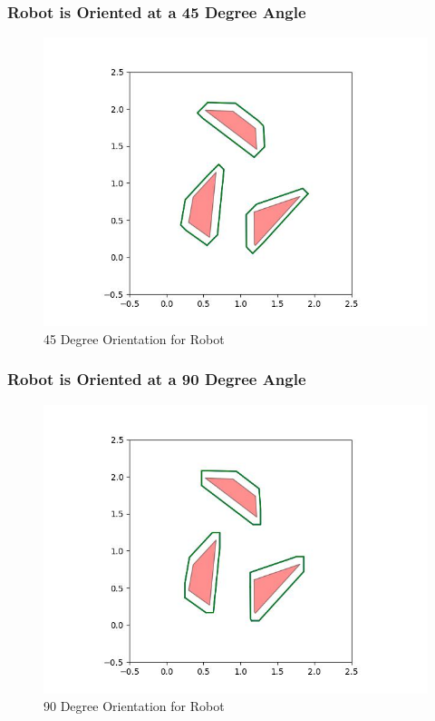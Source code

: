 \documentclass{article}
\begin{document}
\newpage
\subsubsection{Robot is Oriented at a 45 Degree Angle}
\begin{figure}[h!]
	\includegraphics[width= 0.9 \linewidth]{Problem3_minkowski5_45.jpg}
	\centering
	\caption{45 Degree Orientation for Robot}
	\label{Problem3_minkowski5_45.jpg}
\end{figure}

\newpage
\subsubsection{Robot is Oriented at a 90 Degree Angle}
\begin{figure}[h!]
	\includegraphics[width= 0.9 \linewidth]{Problem3_minkowski5_90.jpg}
	\centering
	\caption{90 Degree Orientation for Robot}
	\label{Problem3_minkowski5_90.jpg}
\end{figure}
\end{document}

